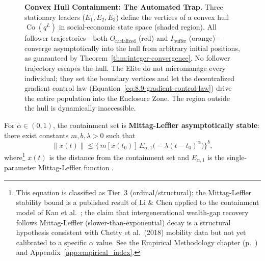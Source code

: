 \begin{figure}[htbp]
\caption{\textbf{Convex Hull Containment: The Automated Trap.} Three stationary leaders ($E_1, E_2, E_3$) define the vertices of a convex hull $\operatorname{Co}(q^L)$ in social-economic state space (shaded region). All follower trajectories---both $O_{\text{racialized}}$ (red) and $I_{\text{buffer}}$ (orange)---converge asymptotically into the hull from arbitrary initial positions, as guaranteed by Theorem~\ref{thm:integer-convergence}. No follower trajectory escapes the hull. The Elite do not micromanage every individual; they set the boundary vertices and let the decentralized gradient control law (Equation~\ref{eq:8.9-gradient-control-law}) drive the entire population into the Enclosure Zone. The region outside the hull is dynamically inaccessible.}
\label{fig:convex_hull_containment}
\end{figure}

\begin{theorem}\label{thm:mittag-leffler}
For $\alpha \in (0,1)$, the containment set is \textbf{Mittag-Leffler asymptotically stable}: there exist constants $m, b, \lambda > 0$ such that
\begin{equation}\label{eq:8.11-mittag-leffler-stability}
\|x(t)\| \leq \bigl\{\, m[x(t_0)]\, E_{\alpha,1}\!\bigl(-\lambda(t-t_0)^{\alpha}\bigr)\bigr\}^{b},
\end{equation}
where\footnote{This equation is classified as Tier~3 (ordinal/structural); the Mittag-Leffler stability bound is a published result of Li \& Chen \cite{li_mittag_leffler} applied to the containment model of Kan et al.\ \cite{kan_containment}; the claim that intergenerational wealth-gap recovery follows Mittag-Leffler (slower-than-exponential) decay is a structural hypothesis consistent with Chetty et al.\ (2018) mobility data but not yet calibrated to a specific $\alpha$ value. See the Empirical Methodology chapter (p.~\pageref{ch:empirical_methodology}) and Appendix~\ref{app:empirical_index}.} $x(t)$ is the distance from the containment set and $E_{\alpha,1}$ is the single-parameter Mittag-Leffler function \cite{li_mittag_leffler, kan_containment}.
\end{theorem}

